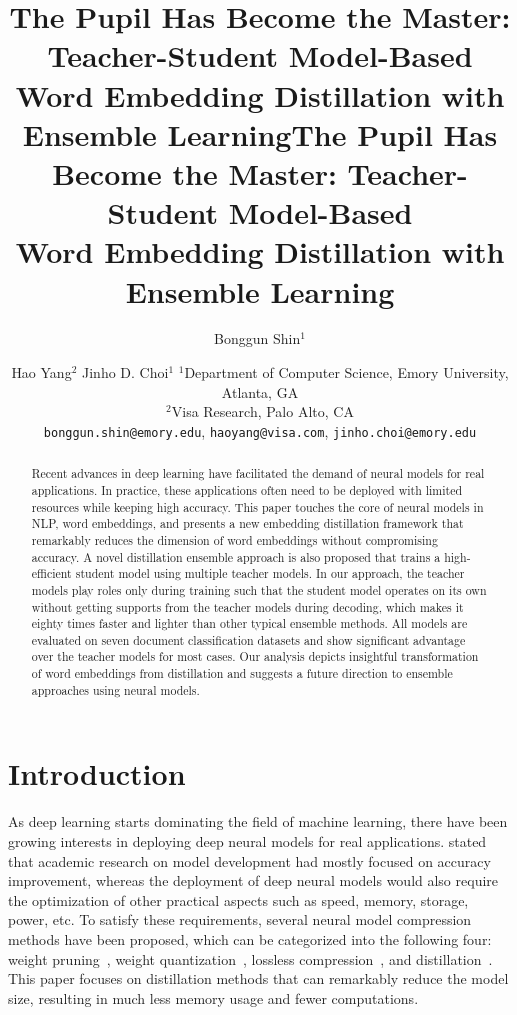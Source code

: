 \documentclass{article}
\title{The Pupil Has Become the Master: Teacher-Student Model-Based\\Word Embedding Distillation with Ensemble Learning}
\author{
Bonggun Shin$^1$
\and
Hao Yang$^2$\And
Jinho D. Choi$^{1}$
\affiliations
$^1$Department of Computer Science, Emory University, Atlanta, GA\\
$^2$Visa Research, Palo Alto, CA\\
\emails
\texttt{bonggun.shin@emory.edu},
\texttt{haoyang@visa.com},
\texttt{jinho.choi@emory.edu}
}
\begin{document}
\title{The Pupil Has Become the Master: Teacher-Student Model-Based\\Word Embedding Distillation with Ensemble Learning}





\maketitle

\begin{abstract}
Recent advances in deep learning have facilitated the demand of neural models for real applications.
In practice, these applications often need to be deployed with limited resources while keeping high accuracy.
This paper touches the core of neural models in NLP, word embeddings, and presents a new embedding distillation framework that remarkably reduces the dimension of word embeddings without compromising accuracy.
A novel distillation ensemble approach is also proposed that trains a high-efficient student model using multiple teacher models.
In our approach, the teacher models play roles only during training such that the student model operates on its own without getting supports from the teacher models during decoding, which makes it eighty times faster and lighter than other typical ensemble methods.
All models are evaluated on seven document classification datasets and show significant advantage over the teacher models for most cases.
Our analysis depicts insightful transformation of word embeddings from distillation and suggests a future direction to ensemble approaches using neural models.
\end{abstract} \section{Introduction}
As deep learning starts dominating the field of machine learning, there have been growing interests in deploying deep neural models for real applications.
\cite{hinton2015distilling} stated that academic research on model development had mostly focused on accuracy improvement, whereas the deployment of deep neural models would also require the optimization of other practical aspects such as speed, memory, storage, power, etc.
To satisfy these requirements, several neural model compression methods have been proposed, which can be categorized into the following four:
weight pruning~\cite{denil2013predicting,han2015learning,jurgovsky2016evaluating}, 
weight quantization~\cite{han2015deep,jurgovsky2016evaluating,ling2016word}, 
lossless compression~\cite{van1976construction,han2015learning}, 
and distillation~\cite{mou2016distilling}.
This paper focuses on distillation methods that can remarkably reduce the model size, resulting in much less memory usage and fewer computations.
\end{document}
